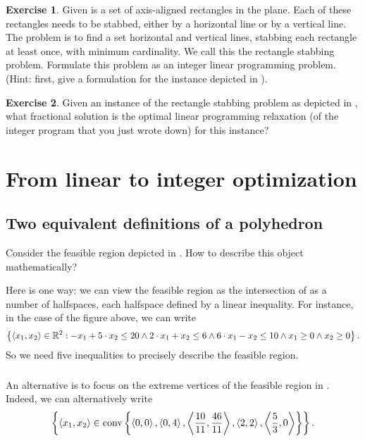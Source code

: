 \documentclass[titlepage]{book}
\theoremstyle{definition}
\newtheorem{exercise}{Exercise}
\begin{document}
\begin{exercise}
Given is a set of axis-aligned rectangles in the plane. Each of these rectangles needs to be stabbed, either by a horizontal line or by a vertical line. The problem is to find a set horizontal and vertical lines, stabbing each rectangle at least once, with minimum cardinality. We call this the rectangle stabbing problem. Formulate this problem as an integer linear programming problem. (Hint: first, give a formulation for the instance depicted in ).
\end{exercise}
\begin{exercise}
Given an instance of the rectangle stabbing problem as depicted in , what fractional solution is the optimal linear programming relaxation (of the integer program that you just wrote down) for this instance?
\end{exercise}


\chapter{From linear to integer optimization}

\section{Two equivalent definitions of a polyhedron}

Consider the feasible region depicted in . How to describe this object mathematically?


Here is one way: we can view the feasible region as the intersection of as a number of halfspaces, each halfspace defined by a linear inequality. For instance, in the case of the figure above, we can write
\begin{equation}
\left\{ \left\langle x_1,x_2 \right\rangle\in\mathbb{R}^2: -x_1+5\cdot x_2\leq 20 \wedge 2\cdot x_1+x_2\leq 6\wedge 6\cdot x_1-x_2\leq 10\wedge x_1\geq 0\wedge x_2\geq 0 \right\}.
\end{equation}
So we need five inequalities to precisely describe the feasible region.

\paragraph{}
An alternative is to focus on the extreme vertices of the feasible region in . Indeed, we can alternatively write
\begin{equation}
\left\{ \left\langle x_1,x_2 \right\rangle\in\mbox{conv}\left\{ \left\langle 0,0 \right\rangle,\left\langle 0,4 \right\rangle,\left\langle \dfrac{10}{11},\dfrac{46}{11} \right\rangle,\left\langle 2,2 \right\rangle,\left\langle \dfrac{5}{3},0 \right\rangle \right\} \right\}.
\end{equation}
\end{document}
